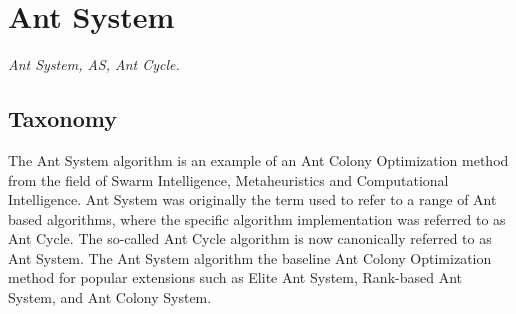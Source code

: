 

\section{Ant System} 
\label{sec:ant_system}

\emph{Ant System, AS, Ant Cycle.}

\subsection{Taxonomy}
The Ant System algorithm is an example of an Ant Colony Optimization method from the field of Swarm Intelligence, Metaheuristics and Computational Intelligence.
Ant System was originally the term used to refer to a range of Ant based algorithms, where the specific algorithm implementation was referred to as Ant Cycle. The so-called Ant Cycle algorithm is now canonically referred to as Ant System. The Ant System algorithm the baseline Ant Colony Optimization method for popular extensions such as Elite Ant System, Rank-based Ant System, and Ant Colony System.

